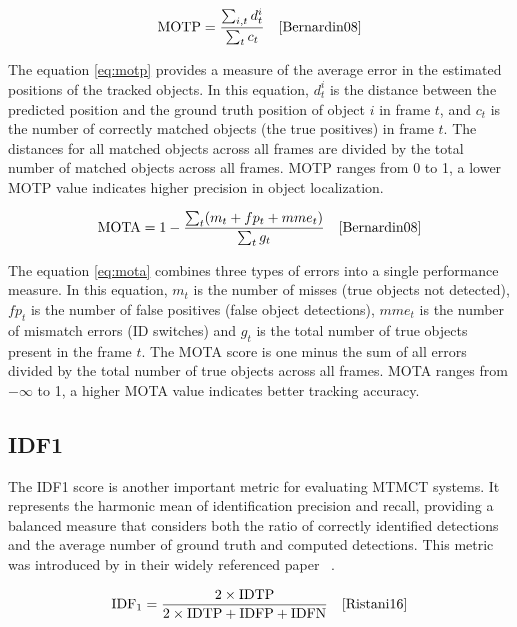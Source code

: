 \begin{equation}
    \label{eq:motp}
    \text{MOTP}=\frac{\sum_{i, t} d_t^i}{\sum_t c_t}
    \quad\text{\cite[Eq.~1]{Bernardin08}}
\end{equation}

The equation \ref{eq:motp} provides a measure of the average error in the estimated positions of the tracked objects. In this equation, \(d_t^i\) is the distance between the predicted position and the ground truth position of object \(i\) in frame \(t\), and \(c_t\) is the number of correctly matched objects (the true positives) in frame \(t\). The distances for all matched objects across all frames are divided by the total number of matched objects across all frames. MOTP ranges from 0 to 1, a lower MOTP value indicates higher precision in object localization.

\begin{equation}
    \label{eq:mota}
    \text{MOTA}=1-\frac{\sum_t (m_t+fp_t+mme_t)}{\sum_t g_t}
    \quad\text{\cite[Eq.~2]{Bernardin08}}
\end{equation}

The equation \ref{eq:mota} combines three types of errors into a single performance measure. In this equation, \(m_t\) is the number of misses (true objects not detected), \(fp_t\) is the number of false positives (false object detections), \(mme_t\) is the number of mismatch errors (ID switches) and \(g_t\) is the total number of true objects present in the frame \(t\). The MOTA score is one minus the sum of all errors divided by the total number of true objects across all frames. MOTA ranges from \(-\infty\) to 1, a higher MOTA value indicates better tracking accuracy.

\subsection{IDF1}\label{subsec:idf1}
The IDF1 score is another important metric for evaluating MTMCT systems. It represents the harmonic mean of identification precision and recall, providing a balanced measure that considers both the ratio of correctly identified detections and the average number of ground truth and computed detections. This metric was introduced by \citeauthor{Ristani16} in their widely referenced paper ~\cite{Ristani16}.

\begin{equation}
    \label{eq:idf1}
    \text{IDF}_1 = \frac{2 \times \text{IDTP}}{2 \times \text{IDTP} + \text{IDFP} + \text{IDFN}}
    \quad\text{\cite[Eq.~11]{Ristani16}}
\end{equation}

